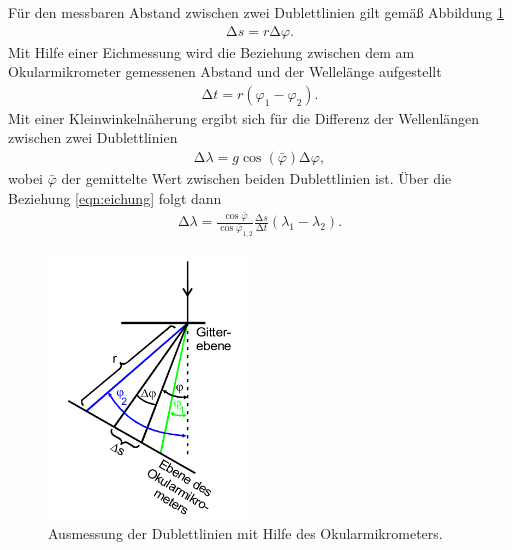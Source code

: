 Für den messbaren Abstand zwischen zwei Dublettlinien gilt gemäß Abbildung
\ref{fig:okular}
\begin{align}
  \increment s = r \increment \varphi.
  \label{eqn:okumess}
\end{align}
Mit Hilfe einer Eichmessung wird die Beziehung zwischen dem am Okularmikrometer
gemessenen Abstand und der Wellelänge aufgestellt
\begin{align}
  \increment t = r (\varphi_1 - \varphi_2).
  \label{eqn:eichung}
\end{align}
Mit einer Kleinwinkelnäherung ergibt sich für die Differenz der Wellenlängen
zwischen zwei Dublettlinien
\begin{align}
  \increment \lambda = g \cos(\bar{\varphi}) \increment \varphi,
\end{align}
wobei $\bar{\varphi}$ der gemittelte Wert zwischen beiden Dublettlinien ist.
Über die Beziehung \eqref{eqn:eichung} folgt dann
\begin{align}
  \increment \lambda = \frac{\cos \bar{\varphi}}{\cos \bar{\varphi}_{1,2}}
  \frac{\increment s}{\increment t} (\lambda_1 - \lambda_2).
  \label{eqn:dellamda}
\end{align}

\begin{figure}
  \centering
  \includegraphics[height = 7cm]{MeinFotoalbum:)/DublettsMessung.png}
  \caption{Ausmessung der Dublettlinien mit Hilfe des Okularmikrometers.
  \cite{anleitung}}
  \label{fig:okular}
\end{figure}
